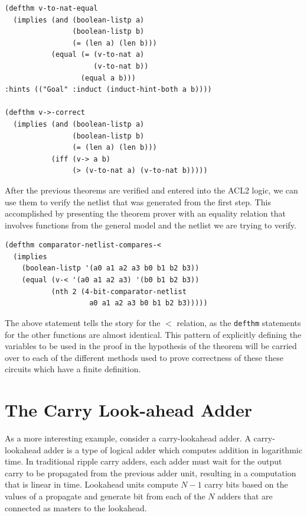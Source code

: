 \documentclass[fleqn,10pt]{SelfArx} %
\begin{document}
\begin{lstlisting}
(defthm v-to-nat-equal
  (implies (and (boolean-listp a)
                (boolean-listp b)
                (= (len a) (len b)))
           (equal (= (v-to-nat a)
                     (v-to-nat b))                   
                  (equal a b)))  
:hints (("Goal" :induct (induct-hint-both a b))))
  
(defthm v->-correct
  (implies (and (boolean-listp a)
                (boolean-listp b)
                (= (len a) (len b)))
           (iff (v-> a b)
                (> (v-to-nat a) (v-to-nat b)))))
\end{lstlisting}

After the previous theorems are verified and entered into the ACL2 logic, we can use them to verify the netlist that was generated from the first step. This accomplished by presenting the theorem prover with an equality relation that involves functions from the general model and the netlist we are trying to verify. 

\begin{lstlisting}
(defthm comparator-netlist-compares-<
  (implies 
    (boolean-listp '(a0 a1 a2 a3 b0 b1 b2 b3))
    (equal (v-< '(a0 a1 a2 a3) '(b0 b1 b2 b3))
           (nth 2 (4-bit-comparator-netlist 
                    a0 a1 a2 a3 b0 b1 b2 b3)))))
\end{lstlisting}

The above statement tells the story for the $<$ relation, as the \lstinline{defthm} statements for the other functions are almost identical. This pattern of explicitly defining the variables to be used in the proof in the hypothesis of the theorem will be carried over to each of the different methods used to prove correctness of these these circuits which have a finite definition.

\section{The Carry Look-ahead Adder}
As a more interesting example, consider a carry-lookahead adder. A carry-lookahead adder is a type of logical adder which computes addition in logarithmic time. In traditional ripple carry adders, each adder must wait for the output carry to be propagated from the previous adder unit, resulting in a computation that is linear in time. Lookahead units compute $N-1$ carry bits based on the values of a propagate and generate bit from each of the $N$ adders that are connected as masters to the lookahead.
\end{document}
